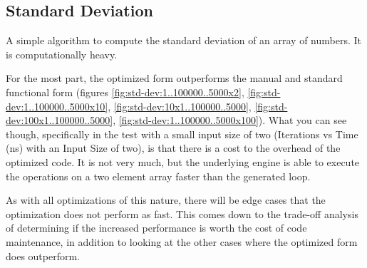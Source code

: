\subsection{Standard Deviation}
A simple algorithm to compute the standard deviation of an array of numbers. It is computationally heavy.

For the most part, the optimized form outperforms the manual and standard functional form (figures \ref{fig:std-dev:1..100000..5000x2}, \ref{fig:std-dev:1..100000..5000x10}, \ref{fig:std-dev:10x1..100000..5000}, \ref{fig:std-dev:100x1..100000..5000}, \ref{fig:std-dev:1..100000..5000x100}).  What you can see though, specifically in the test with a small input size of two (Iterations vs Time (ns) with an Input Size of two), is that there is a cost to the overhead of the optimized code.  It is not very much, but the underlying \javascript engine is able to execute the operations on a two element array faster than the generated  loop.  

As with all optimizations of this nature, there will be edge cases that the optimization does not perform as fast.  This comes down to the trade-off analysis of determining if the increased performance is worth the cost of code maintenance, in addition to looking at the other cases where the optimized form does outperform.